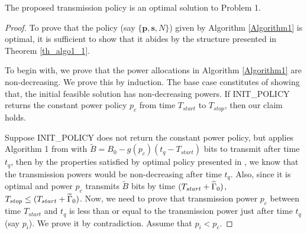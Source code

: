 \begin{theorem}
The proposed transmission policy is an optimal solution to Problem 1.
\label{th_algo1_2}
\end{theorem}
\begin{proof}
To prove that the policy (say $\{\textbf{p},\textbf{s},N\}$) given by Algorithm \ref{Algorithm1} is optimal, it is sufficient to show that it abides by the structure presented in Theorem \ref{th_algo1_1}.

To begin with, we prove that the power allocations in Algorithm \ref{Algorithm1} are non-decreasing. We prove this by induction. The base case constitutes of showing that, the initial feasible solution has non-decreasing powers. If INIT\_POLICY returns the constant power policy $p_c$ from time $T_{start}$ to $T_{stop}$, then our claim holds. 

Suppose INIT\_POLICY does not return the constant power policy, but applies Algorithm 1 from \cite{Yang} with $\widetilde{B}=B_0-g(p_c)(t_q-T_{start})$ bits to transmit after time $t_q$, then by the properties satisfied by optimal policy presented in \cite{Yang}, we know that the transmission powers would be non-decreasing after time $t_q$. Also, since it is optimal and power $p_c$ transmits $\widetilde{B}$ bits by time $(T_{start}+\widetilde{\Gamma}_0)$,  $T_{stop}\le (T_{start}+\widetilde{\Gamma}_0)$. Now, we need to prove that transmission power $p_c$ between time $T_{start}$ and $t_q$ is less than or equal to the transmission power just after time $t_q$ (say $p_i$). We prove it by contradiction. Assume that $p_i<p_c$.


\end{proof}
